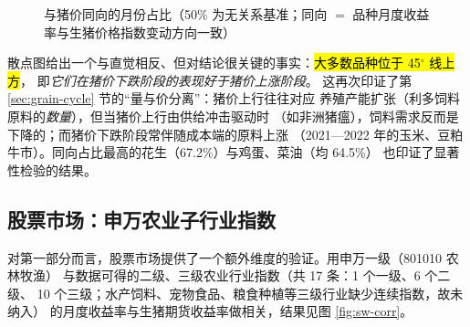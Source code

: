 \begin{figure}[htbp]
\centering
{}
\caption{与猪价同向的月份占比（50\% 为无关系基准；同向 $=$ 品种月度收益率与生猪价格指数变动方向一致）}
\label{fig:phase-same}
\end{figure}



散点图给出一个与直觉相反、但对结论很关键的事实：\hl{大多数品种位于 45$^\circ$ 线上方}，
即\emph{它们在猪价下跌阶段的表现好于猪价上涨阶段}。
这再次印证了第 \ref{sec:grain-cycle} 节的“量与价分离”：猪价上行往往对应
养殖产能扩张（利多饲料原料的\emph{数量}），但当猪价上行由供给冲击驱动时
（如非洲猪瘟），饲料需求反而是下降的；而猪价下跌阶段常伴随成本端的原料上涨
（2021---2022 年的玉米、豆粕牛市）。同向占比最高的花生（67.2\%）与鸡蛋、菜油（均 64.5\%）
也印证了显著性检验的结果。

\subsection{股票市场：申万农业子行业指数}
\label{sec:corr-sw}

对第一部分而言，股票市场提供了一个额外维度的验证。用申万一级（801010 农林牧渔）
与数据可得的二级、三级农业行业指数（共 \num{17} 条：\num{1} 个一级、\num{6} 个二级、
\num{10} 个三级；水产饲料、宠物食品、粮食种植等三级行业缺少连续指数，故未纳入）
的月度收益率与生猪期货收益率做相关，结果见图 \ref{fig:sw-corr}。

